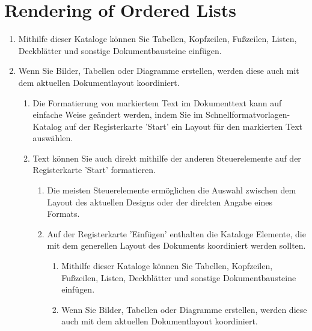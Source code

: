 \documentclass[11pt,a4paper]{article}
\begin{document}
\section{\XeTeX{} Rendering of Ordered Lists}
\begin{enumerate}
	\item Mithilfe dieser Kataloge können Sie Tabellen, Kopfzeilen, Fußzeilen, Listen, Deckblätter und sonstige Dokumentbausteine einfügen.
	\item Wenn Sie Bilder, Tabellen oder Diagramme erstellen, werden diese auch mit dem aktuellen Dokumentlayout koordiniert.
	\begin{enumerate}
		\item Die Formatierung von markiertem Text im Dokumenttext kann auf einfache Weise geändert werden, indem Sie im Schnellformatvorlagen-Katalog auf der Registerkarte 'Start' ein Layout für den markierten Text auswählen.
		\item Text können Sie auch direkt mithilfe der anderen Steuerelemente auf der Registerkarte 'Start' formatieren.
		\begin{enumerate}
			\item Die meisten Steuerelemente ermöglichen die Auswahl zwischen dem Layout des aktuellen Designs oder der direkten Angabe eines Formats.
			\item Auf der Registerkarte 'Einfügen' enthalten die Kataloge Elemente, die mit dem generellen Layout des Dokuments koordiniert werden sollten.
			\begin{enumerate}
				\item Mithilfe dieser Kataloge können Sie Tabellen, Kopfzeilen, Fußzeilen, Listen, Deckblätter und sonstige Dokumentbausteine einfügen.
				\item Wenn Sie Bilder, Tabellen oder Diagramme erstellen, werden diese auch mit dem aktuellen Dokumentlayout koordiniert.
			\end{enumerate}
		\end{enumerate}
	\end{enumerate}
\end{enumerate}
\end{document}
